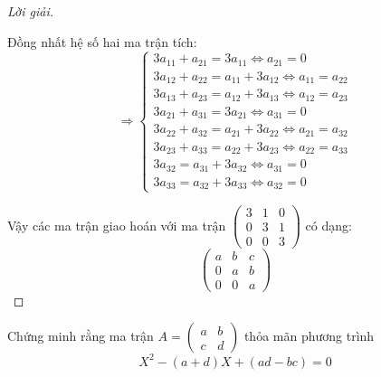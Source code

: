 \documentclass[class=linearalgebra,crop=false]{standalone}
\begin{document}
\begin{proof}[Lời giải]
\[    \]
    \par Đồng nhất hệ số hai ma trận tích:
    \[
        \Rightarrow
        \begin{cases}
            3a_{11} + a_{21} = 3a_{11} \Leftrightarrow a_{21} = 0               \\
            3a_{12} + a_{22} = a_{11} + 3a_{12} \Leftrightarrow a_{11} = a_{22} \\
            3a_{13} + a_{23} = a_{12} + 3a_{13} \Leftrightarrow a_{12} = a_{23} \\
            3a_{21} + a_{31} = 3a_{21} \Leftrightarrow a_{31} = 0               \\
            3a_{22} + a_{32} = a_{21} + 3a_{22} \Leftrightarrow a_{21} = a_{32} \\
            3a_{23} + a_{33} = a_{22} + 3a_{23} \Leftrightarrow a_{22} = a_{33} \\
            3a_{32} = a_{31} + 3a_{32} \Leftrightarrow a_{31} = 0               \\
            3a_{33} = a_{32} + 3a_{33} \Leftrightarrow a_{32} = 0
        \end{cases}
    \]
    \par Vậy các ma trận giao hoán với ma trận
    $\begin{pmatrix}
            3 & 1 & 0 \\
            0 & 3 & 1 \\
            0 & 0 & 3
        \end{pmatrix}$
    có dạng:
    \[
        \begin{pmatrix}
            a & b & c \\
            0 & a & b \\
            0 & 0 & a
        \end{pmatrix}
    \]
\end{proof}

\begin{exercise}\label{characteristic-poly}
    Chứng minh rằng ma trận
    $A = \begin{pmatrix}a & b \\ c & d\end{pmatrix}$ thỏa mãn phương trình
    \[
        X^{2} - (a+d)X + (ad-bc) = 0
    \]
\end{exercise}
\end{document}
